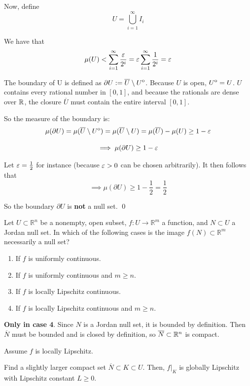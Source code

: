 \documentclass[12pt]{article}
\begin{document}
Now, define
$$
    U = \bigcup\limits_{i = 1}^{\infty} I_i
$$

We have that
$$
    \mu(U) < \sum_{i = 1}^{\infty} \frac{\varepsilon}{2^i} = \varepsilon \sum_{i = 1}^{\infty} \frac{1}{2^i} = \varepsilon
$$

The boundary of U is defined as $\partial U := \overline{U} \setminus {\kern0ptU}^{\mathrm{o}}$. Because $U$ is open, ${\kern0ptU}^{\mathrm{o}} = U$. $U$ contains every rational number in $[0, 1]$, and because the rationals are dense over $\mathbb{R}$, the closure $\overline{U}$ must contain the entire interval $[0, 1]$.

So the measure of the boundary is:
$$
    \mu(\partial U) = \mu(\overline{U} \setminus {\kern0ptU}^{\mathrm{o}}) = \mu(\overline{U} \setminus U) = \mu(\overline{U}) - \mu(U) \geq 1 - \varepsilon
$$

$$
    \implies \mu(\partial U) \geq 1 - \varepsilon
$$

Let $\varepsilon = \frac{1}{2}$ for instance (because $\varepsilon > 0$ can be chosen arbitrarily). It then follows that
$$
\implies \mu(\partial U) \geq 1 - \frac{1}{2} = \frac{1}{2}
$$

So the boundary $\partial U$ is \textbf{not} a null set. \qed

\newpage

\begin{problem}{}{}
    Let $U \subset \mathbb{R}^n$ be a nonempty, open subset, $f: U \to \mathbb{R}^m$ a function, and $N \subset U$ a Jordan null set. In which of the following cases is the image $f(N) \subset \mathbb{R}^m$ necessarily a null set?

\begin{enumerate}
    \item If $f$ is uniformly continuous.
    \item If $f$ is uniformly continuous and $m \geq n$.
    \item If $f$ is locally Lipschitz continuous.
    \item If $f$ is locally Lipschitz continuous and $m \geq n$.
\end{enumerate}
\end{problem}

\textbf{Only in case 4}. Since $N$ is a Jordan null set, it is bounded by definition. Then $\overline{N}$ must be bounded and is closed by definition, so $\overline{N} \subset \mathbb{R}^n$ is compact.

Assume $f$ is locally Lipschitz.

Find a slightly larger compact set $\overline{N} \subset K \subset U$. Then, $f|_K$ is globally Lipschitz with Lipschitz constant $L \geq 0$.
\end{document}
